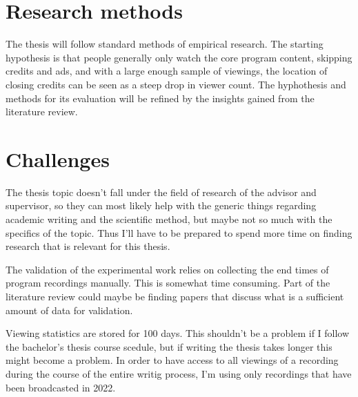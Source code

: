 \documentclass[12pt,a4paper,english,oneside]{article}
\begin{document}
\section{Research methods}

The thesis will follow standard methods of empirical research. The starting hypothesis is that people generally only watch the core program content, skipping credits and ads, and with a large enough sample of viewings, the location of closing credits can be seen as a steep drop in viewer count. The hyphothesis and methods for its evaluation will be refined by the insights gained from the literature review.

\section{Challenges}

The thesis topic doesn't fall under the field of research of the advisor and supervisor, so they can most likely help with the generic things regarding academic writing and the scientific method, but maybe not so much with the specifics of the topic. Thus I'll have to be prepared to spend more time on finding research that is relevant for this thesis.

The validation of the experimental work relies on collecting the end times of program recordings manually. This is somewhat time consuming. Part of the literature review could maybe be finding papers that discuss what is a sufficient amount of data for validation.

Viewing statistics are stored for 100 days. This shouldn't be a problem if I follow the bachelor's thesis course scedule, but if writing the thesis takes longer this might become a problem. In order to have access to all viewings of a recording during the course of the entire writig process, I'm using only recordings that have been broadcasted in 2022.

\end{document}
